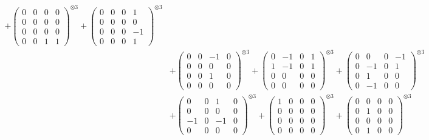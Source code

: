 \documentclass{article}
\begin{document}
{\begin{align}
            + \begin{pmatrix} 0 & 0 & 0 & 0 \\ 0 & 0 & 0 & 0 \\ 0 & 0 & 0 & 0 \\ 0 & 0 & 1 & 1 \end{pmatrix}^{\otimes 3} 
            + \begin{pmatrix} 0 & 0 & 0 & 1 \\ 0 & 0 & 0 & 0 \\ 0 & 0 & 0 & -1 \\ 0 & 0 & 0 & 1 \end{pmatrix}^{\otimes 3} \\
        &+ \label{Rs16-Rc11-Solution-28-c10} \begin{pmatrix} 0 & 0 & -1 & 0 \\ 0 & 0 & 0 & 0 \\ 0 & 0 & 1 & 0 \\ 0 & 0 & 0 & 0 \end{pmatrix}^{\otimes 3} 
            + \begin{pmatrix} 0 & -1 & 0 & 1 \\ 1 & -1 & 0 & 1 \\ 0 & 0 & 0 & 0 \\ 0 & 0 & 0 & 0 \end{pmatrix}^{\otimes 3} 
            + \begin{pmatrix} 0 & 0 & 0 & -1 \\ 0 & -1 & 0 & 1 \\ 0 & 1 & 0 & 0 \\ 0 & -1 & 0 & 0 \end{pmatrix}^{\otimes 3} \\
        &+ \label{Rs16-Rc11-Solution-28-c13} \begin{pmatrix} 0 & 0 & 1 & 0 \\ 0 & 0 & 0 & 0 \\ -1 & 0 & -1 & 0 \\ 0 & 0 & 0 & 0 \end{pmatrix}^{\otimes 3} 
            + \begin{pmatrix} 1 & 0 & 0 & 0 \\ 0 & 0 & 0 & 0 \\ 0 & 0 & 0 & 0 \\ 0 & 0 & 0 & 0 \end{pmatrix}^{\otimes 3} 
            + \begin{pmatrix} 0 & 0 & 0 & 0 \\ 0 & 1 & 0 & 0 \\ 0 & 0 & 0 & 0 \\ 0 & 1 & 0 & 0 \end{pmatrix}^{\otimes 3} \\

\end{align}}
\end{document}
